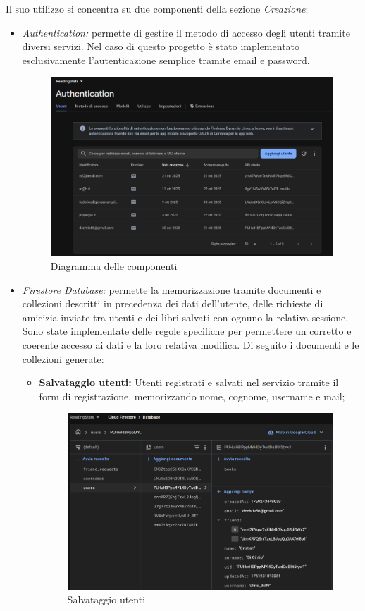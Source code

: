 \documentclass{article}
\begin{document}
Il suo utilizzo si concentra su due componenti della sezione \textit{Creazione}:
\begin{itemize}
  \item \textit{Authentication:} permette di gestire il metodo di accesso degli utenti tramite diversi servizi. Nel caso di questo progetto è stato implementato esclusivamente l'autenticazione semplice tramite email e password.
    \begin{figure}[H]
    \centering
    \includegraphics[width=1\linewidth]{authentication.png}
    \caption{Diagramma delle componenti}
    \label{fig:sitemap}
  \end{figure}
  \item \textit{Firestore Database:} permette la memorizzazione tramite documenti e collezioni descritti in precedenza dei dati dell'utente, delle richieste di amicizia inviate tra utenti e dei libri salvati con ognuno la relativa sessione. 
  Sono state implementate delle regole specifiche per permettere un corretto e coerente accesso ai dati e la loro relativa modifica. Di seguito i documenti e le collezioni generate:

  \begin{itemize}
    \item \textbf{Salvataggio utenti:} Utenti registrati e salvati nel servizio tramite il form di registrazione, memorizzando nome, cognome, username e mail;
    
    \begin{figure}[H]
      \centering
      \includegraphics[width=0.7\linewidth]{users.png}
      \caption{Salvataggio utenti}
      \label{fig:sitemap}
    \end{figure}
    

\end{itemize}
\end{itemize}
\end{document}
